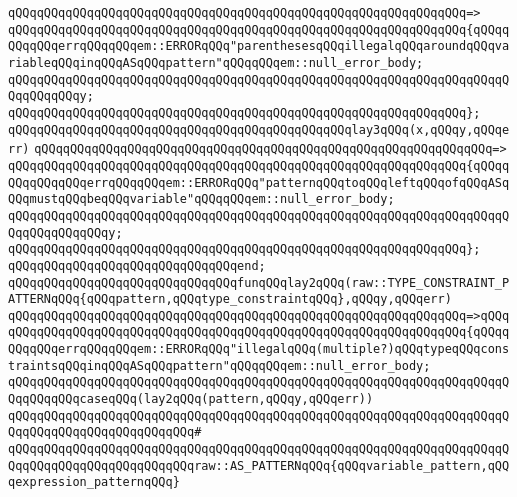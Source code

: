 \verb|qQQqqQQqqQQqqQQqqQQqqQQqqQQqqQQqqQQqqQQqqQQqqQQqqQQqqQQqqQQqqQQq=>|\newline
\verb|qQQqqQQqqQQqqQQqqQQqqQQqqQQqqQQqqQQqqQQqqQQqqQQqqQQqqQQqqQQqqQQq{qQQqqQQqqQQqerrqQQqqQQqem::ERRORqQQq"parenthesesqQQqillegalqQQqaroundqQQqvariableqQQqinqQQqASqQQqpattern"qQQqqQQqem::null_error_body;|\newline
\verb|qQQqqQQqqQQqqQQqqQQqqQQqqQQqqQQqqQQqqQQqqQQqqQQqqQQqqQQqqQQqqQQqqQQqqQQqqQQqqQQqy;|\newline
\verb|qQQqqQQqqQQqqQQqqQQqqQQqqQQqqQQqqQQqqQQqqQQqqQQqqQQqqQQqqQQqqQQq};|\newline
\newline
\verb|qQQqqQQqqQQqqQQqqQQqqQQqqQQqqQQqqQQqqQQqqQQqqQQqlay3qQQq(x,qQQqy,qQQqerr)|\newline
\verb|qQQqqQQqqQQqqQQqqQQqqQQqqQQqqQQqqQQqqQQqqQQqqQQqqQQqqQQqqQQqqQQq=>|\newline
\verb|qQQqqQQqqQQqqQQqqQQqqQQqqQQqqQQqqQQqqQQqqQQqqQQqqQQqqQQqqQQqqQQq{qQQqqQQqqQQqqQQqerrqQQqqQQqem::ERRORqQQq"patternqQQqtoqQQqleftqQQqofqQQqASqQQqmustqQQqbeqQQqvariable"qQQqqQQqem::null_error_body;|\newline
\verb|qQQqqQQqqQQqqQQqqQQqqQQqqQQqqQQqqQQqqQQqqQQqqQQqqQQqqQQqqQQqqQQqqQQqqQQqqQQqqQQqqQQqy;|\newline
\verb|qQQqqQQqqQQqqQQqqQQqqQQqqQQqqQQqqQQqqQQqqQQqqQQqqQQqqQQqqQQqqQQq};|\newline
\verb|qQQqqQQqqQQqqQQqqQQqqQQqqQQqqQQqend;|\newline
\newline
\verb|qQQqqQQqqQQqqQQqqQQqqQQqqQQqqQQqfunqQQqlay2qQQq(raw::TYPE_CONSTRAINT_PATTERNqQQq{qQQqpattern,qQQqtype_constraintqQQq},qQQqy,qQQqerr)|\newline
\verb|qQQqqQQqqQQqqQQqqQQqqQQqqQQqqQQqqQQqqQQqqQQqqQQqqQQqqQQqqQQqqQQq=>qQQq|\newline
\verb|qQQqqQQqqQQqqQQqqQQqqQQqqQQqqQQqqQQqqQQqqQQqqQQqqQQqqQQqqQQqqQQq{qQQqqQQqqQQqerrqQQqqQQqem::ERRORqQQq"illegalqQQq(multiple?)qQQqtypeqQQqconstraintsqQQqinqQQqASqQQqpattern"qQQqqQQqem::null_error_body;|\newline
\newline
\verb|qQQqqQQqqQQqqQQqqQQqqQQqqQQqqQQqqQQqqQQqqQQqqQQqqQQqqQQqqQQqqQQqqQQqqQQqqQQqqQQqcaseqQQq(lay2qQQq(pattern,qQQqy,qQQqerr))|\newline
\verb|qQQqqQQqqQQqqQQqqQQqqQQqqQQqqQQqqQQqqQQqqQQqqQQqqQQqqQQqqQQqqQQqqQQqqQQqqQQqqQQqqQQqqQQqqQQqqQQq#|\newline
\verb|qQQqqQQqqQQqqQQqqQQqqQQqqQQqqQQqqQQqqQQqqQQqqQQqqQQqqQQqqQQqqQQqqQQqqQQqqQQqqQQqqQQqqQQqqQQqqQQqraw::AS_PATTERNqQQq{qQQqvariable_pattern,qQQqexpression_patternqQQq}|\newline
